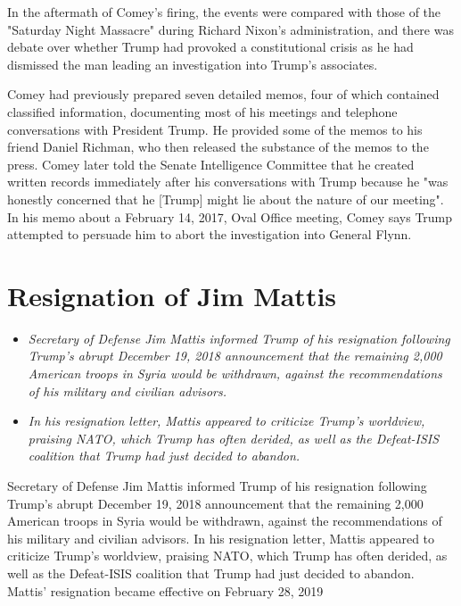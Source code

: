 In the aftermath of Comey's firing, the events were compared with those
of the "Saturday Night Massacre" during Richard Nixon's administration,
and there was debate over whether Trump had provoked a constitutional
crisis as he had dismissed the man leading an investigation into Trump's
associates.

Comey had previously prepared seven detailed memos, four of which
contained classified information, documenting most of his meetings and
telephone conversations with President Trump. He provided some of the
memos to his friend Daniel Richman, who then released the substance of
the memos to the press. Comey later told the Senate Intelligence
Committee that he created written records immediately after his
conversations with Trump because he "was honestly concerned that he
{[}Trump{]} might lie about the nature of our meeting". In his memo
about a February 14, 2017, Oval Office meeting, Comey says Trump
attempted to persuade him to abort the investigation into General Flynn.

\section{Resignation of Jim Mattis}\label{resignation-of-jim-mattis}

\begin{itemize}
\item
  \emph{Secretary of Defense Jim Mattis informed Trump of his
  resignation following Trump's abrupt December 19, 2018 announcement
  that the remaining 2,000 American troops in Syria would be withdrawn,
  against the recommendations of his military and civilian advisors.}
\item
  \emph{In his resignation letter, Mattis appeared to criticize Trump's
  worldview, praising NATO, which Trump has often derided, as well as
  the Defeat-ISIS coalition that Trump had just decided to abandon.}
\end{itemize}

Secretary of Defense Jim Mattis informed Trump of his resignation
following Trump's abrupt December 19, 2018 announcement that the
remaining 2,000 American troops in Syria would be withdrawn, against the
recommendations of his military and civilian advisors. In his
resignation letter, Mattis appeared to criticize Trump's worldview,
praising NATO, which Trump has often derided, as well as the Defeat-ISIS
coalition that Trump had just decided to abandon. Mattis' resignation
became effective on February 28, 2019

